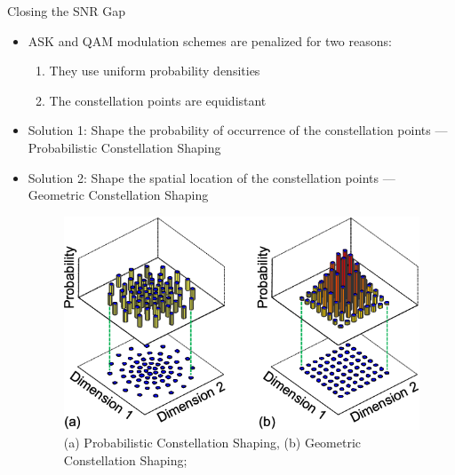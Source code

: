 \documentclass[english,aspectratio=1610,9pt,helvet,nicetitles]{ICEbeamerTUMCD}
\begin{document}
\begin{frame}{Closing the SNR Gap}
	\begin{itemize}
	\item ASK and QAM modulation schemes are penalized for two reasons:
	\begin{enumerate}
		\item They use uniform probability densities
		\item The constellation points are equidistant
	\end{enumerate}
	\item Solution 1: Shape the probability of occurrence of the constellation points --- Probabilistic Constellation Shaping
	\item Solution 2: Shape the spatial location of the constellation points --- Geometric Constellation Shaping
	\begin{figure}
	\includegraphics[width=0.4\columnwidth]{ressources/PCS_GCS.png}
	\caption{(a) Probabilistic Constellation Shaping, (b) Geometric Constellation Shaping; \cite{Cho2019ProbabilisticCS}}
	\end{figure}
	\end{itemize}

\end{frame}
\end{document}
